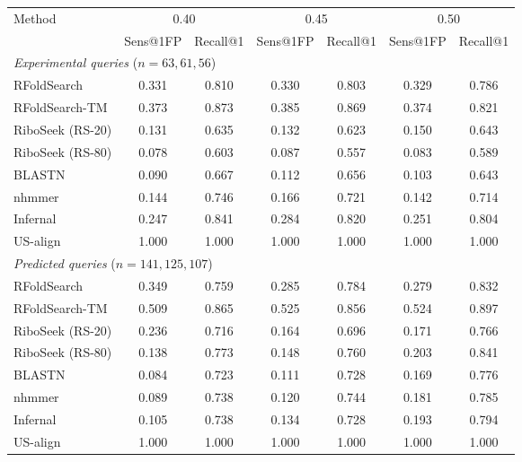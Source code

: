 \begin{tabular}{lcccccc}
\toprule
Method & \multicolumn{2}{c}{0.40} & \multicolumn{2}{c}{0.45} & \multicolumn{2}{c}{0.50} \\
 & Sens@1FP & Recall@1 & Sens@1FP & Recall@1 & Sens@1FP & Recall@1 \\
\midrule
\multicolumn{7}{l}{\textit{Experimental queries} ($n = 63, 61, 56$)} \\
\quad RFoldSearch & 0.331 & 0.810 & 0.330 & 0.803 & 0.329 & 0.786 \\
\quad RFoldSearch-TM & 0.373 & 0.873 & 0.385 & 0.869 & 0.374 & 0.821 \\
\quad RiboSeek (RS-20) & 0.131 & 0.635 & 0.132 & 0.623 & 0.150 & 0.643 \\
\quad RiboSeek (RS-80) & 0.078 & 0.603 & 0.087 & 0.557 & 0.083 & 0.589 \\
\quad BLASTN & 0.090 & 0.667 & 0.112 & 0.656 & 0.103 & 0.643 \\
\quad nhmmer & 0.144 & 0.746 & 0.166 & 0.721 & 0.142 & 0.714 \\
\quad Infernal & 0.247 & 0.841 & 0.284 & 0.820 & 0.251 & 0.804 \\
\quad US-align & 1.000 & 1.000 & 1.000 & 1.000 & 1.000 & 1.000 \\
\midrule
\multicolumn{7}{l}{\textit{Predicted queries} ($n = 141, 125, 107$)} \\
\quad RFoldSearch & 0.349 & 0.759 & 0.285 & 0.784 & 0.279 & 0.832 \\
\quad RFoldSearch-TM & 0.509 & 0.865 & 0.525 & 0.856 & 0.524 & 0.897 \\
\quad RiboSeek (RS-20) & 0.236 & 0.716 & 0.164 & 0.696 & 0.171 & 0.766 \\
\quad RiboSeek (RS-80) & 0.138 & 0.773 & 0.148 & 0.760 & 0.203 & 0.841 \\
\quad BLASTN & 0.084 & 0.723 & 0.111 & 0.728 & 0.169 & 0.776 \\
\quad nhmmer & 0.089 & 0.738 & 0.120 & 0.744 & 0.181 & 0.785 \\
\quad Infernal & 0.105 & 0.738 & 0.134 & 0.728 & 0.193 & 0.794 \\
\quad US-align & 1.000 & 1.000 & 1.000 & 1.000 & 1.000 & 1.000 \\
\bottomrule
\end{tabular}
